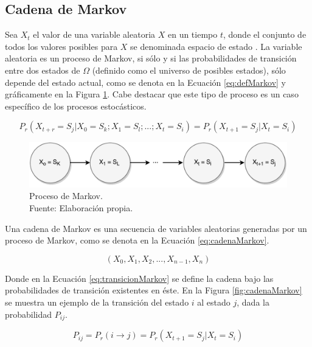 \subsection{Cadena de Markov}
\label{subsec:cadenaMarkov}

Sea $X_t$ el valor de una variable aleatoria $X$ en un tiempo $t$, donde el conjunto de todos los valores posibles para $X$ se denominada espacio de estado \citep{ching2006markov}. La variable aleatoria es un proceso de Markov, si s\'olo y si las probabilidades de transici\'on entre dos estados de $\Omega$ (definido como el universo de posibles estados), s\'olo depende del estado actual, como se denota en la Ecuaci\'on \ref{eq:defMarkov} y gr\'aficamente en la Figura \ref{fig:procesoMarkov}. Cabe destacar que este tipo de proceso es un caso espec\'ifico de los procesos estoc\'asticos.

\begin{equation} \label{eq:defMarkov} 
	P_r(X_{t+r} = S_j | X_0 = S_k ; X_1 = S_l ; ... ; X_t = S_i) = P_r(X_{t+1} = S_j | X_t = S_i)
\end{equation}

\begin{figure}[ht!]
  \centering
    \includegraphics[scale=0.6]{images/ProcesoMarkov.pdf}
  \caption[Proceso de Markov.]{Proceso de Markov.\\Fuente: Elaboraci\'on propia.}
  \label{fig:procesoMarkov}
\end{figure}

Una cadena de Markov es una secuencia de variables aleatorias generadas por un proceso de Markov, como se denota en la Ecuaci\'on \ref{eq:cadenaMarkov}.

\begin{equation} \label{eq:cadenaMarkov}
	(X_0, X_1, X_2, ..., X_{n-1}, X_{n})
\end{equation}

\normalsize{Donde en la Ecuaci\'on} \ref{eq:transicionMarkov} \normalsize{se define la cadena bajo las probabilidades de transici\'on existentes en \'este.} En la Figura \ref{fig:cadenaMarkov} se muestra un ejemplo de la transici\'on del estado $i$ al estado $j$, dada la probabilidad $P_{ij}$.

\begin{equation} \label{eq:transicionMarkov}
	P_{ij} = P_r(i \rightarrow j) = P_r(X_{t+1} = S_j | X_t = S_i)
\end{equation}

